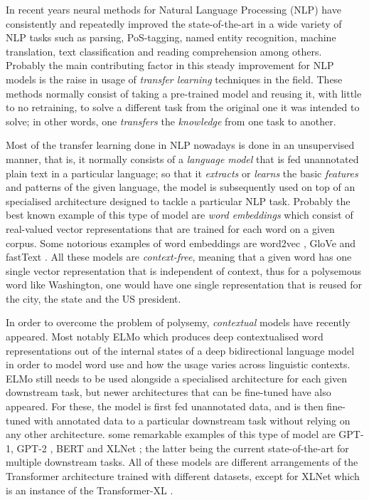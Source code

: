 In recent years neural methods for Natural Language Processing (NLP) have consistently and repeatedly improved the state-of-the-art in a wide variety of NLP tasks such as parsing, PoS-tagging, named entity recognition, machine translation, text classification and reading comprehension among others. Probably the main contributing factor in this steady improvement for NLP models is the raise in usage of \emph{transfer learning} techniques in the field. These methods normally consist of taking a pre-trained model and reusing it, with little to no retraining, to solve a different task from the original one it was intended to solve; in other words, one \emph{transfers} the \emph{knowledge} from one task to another.

Most of the transfer learning done in NLP nowadays is done in an unsupervised manner, that is, it normally consists of a  \emph{language model} that is fed unannotated plain text in a particular language; so that it \emph{extracts} or \emph{learns} the basic \emph{features} and patterns of the given language, the model is subsequently used on top of an specialised architecture designed to tackle a particular NLP task. Probably the best known example of this type of model are \emph{word embeddings} which consist of real-valued vector representations that are trained for each word on a given corpus. Some notorious examples of word embeddings are word2vec \citep{mikolov-etal-2013-distributed}, GloVe \citep{pennington-etal-2014-glove} and \mbox{fastText} \citep{mikolov-etal-2018-advances}. All these models are \emph{context-free}, meaning that a given word has one single vector representation that is independent of context, thus for a polysemous word like Washington, one would have one single representation that is reused for the city, the state and the US president.

In order to overcome the problem of polysemy, \emph{contextual} models have recently appeared. Most notably ELMo \citep{peters-etal-2018-deep} which produces deep contextualised word representations out of the internal states of a deep bidirectional language model in order to model word use and how the usage varies across linguistic contexts. ELMo still needs to be used alongside a specialised architecture for each given downstream task, but newer architectures that can be fine-tuned have also appeared. For these, the model is first fed unannotated data, and is then fine-tuned with annotated data to a particular downstream task without relying on any other architecture. some remarkable examples of this type of model are GPT-1, GPT-2 \citep{radford-etal-2018-improving,radford-etal-2019-language}, BERT \citep{devlin-etal-2019-bert} and XLNet \citep{yang-etal-2019-xlnet}; the latter being the current state-of-the-art for multiple downstream tasks. All of these models are different arrangements of the Transformer architecture \citep{vaswani-etal-2017-attention} trained with different datasets, except for XLNet which is an instance of the Transformer-XL \citep{dai-etal-2019-transformer}.

